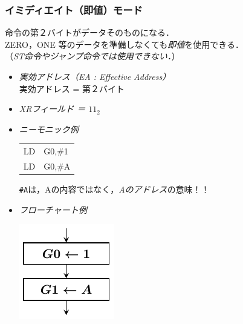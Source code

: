 \documentclass[handout]{beamer}        %
\begin{document}
\begin{frame}
  \frametitle{イミディエイト（即値）モード}
  命令の第２バイトがデータそのものになる．\\
  ZERO，ONE 等のデータを準備しなくても\emph{即値}を使用できる．\\
  （\emph{ST命令やジャンプ命令では使用できない．}）\\
  \vfill
  \begin{itemize}
  \item \emph{実効アドレス（EA : Effective Address）} \\
    実効アドレス = 第２バイト \\
    \vfill
  \item \emph{XRフィールド ＝ $11_2$}
    \vfill
  \item \emph{ニーモニック例} \\
    {\ttfamily\vspace{-0.5cm}\begin{center}
      \begin{tabular}{l l}
        LD & G0,\#1 \\
        LD & G0,\#A \\
      \end{tabular}
    \end{center}}
    \texttt{\#A}は，Aの内容ではなく，\emph{Aのアドレス}の意味！！
    \vfill
  \item \emph{フローチャート例} \\
    \vspace{-0.5cm}\centerline{\includegraphics[scale=0.8]{../Tikz/flowG.pdf}}
  \end{itemize}
  \vfill
  \vfill
\end{frame}
\end{document}
